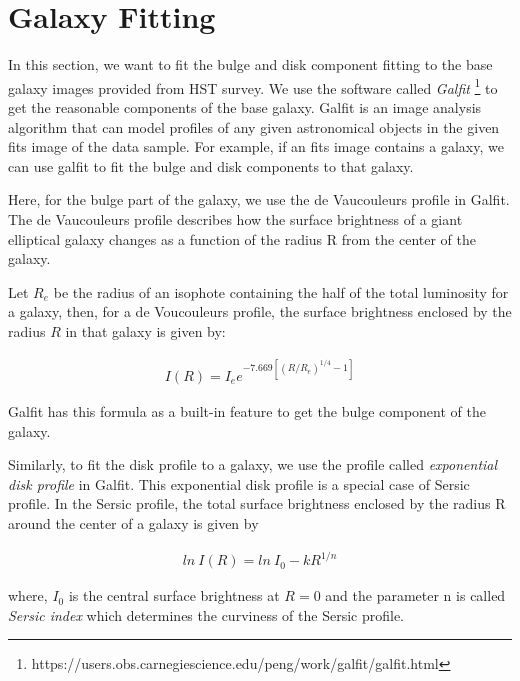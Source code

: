 %
%
%
%
\section{Galaxy Fitting}\label{sec:chap2}
In this section, we want to fit the bulge and disk component fitting to the base 
galaxy images provided from HST survey. We use the software called 
\textit{Galfit} \footnote{https://users.obs.carnegiescience.edu/peng/work/galfit/galfit.html}
to get the reasonable components of the base galaxy. Galfit is an image analysis
algorithm that can model profiles of any given astronomical objects in the given
fits image of the data sample. For example, if an fits image contains a galaxy,
we can use galfit to fit the bulge and disk components to that galaxy.

Here, for the bulge part of the galaxy, we use the de Vaucouleurs profile in 
Galfit.
The de Vaucouleurs profile describes how the surface brightness of a giant
elliptical galaxy changes as a  function of the radius R from the center of the
galaxy.

Let $R_e$ be the radius of an isophote containing the half of the total 
luminosity for a galaxy, then, for a de Voucouleurs profile, the surface 
brightness enclosed by the radius $R$ in that galaxy is given by:

\begin{eqnarray}\label{[eq:devauc]}
    I(R) = I_e e^{-7.669 [ (R/R_e)^{1/4} -1]  }
\end{eqnarray}

Galfit has this formula as a built-in feature to get the bulge component of the
galaxy.

Similarly, to fit the disk profile to a galaxy, we use the profile called 
\textit{exponential disk profile} in Galfit. This exponential disk profile 
is a special case of Sersic profile. In the Sersic
profile, the total surface brightness enclosed by the radius R around the center
of a galaxy is given by

\begin{eqnarray}\label{[eq:sersic]}
    ln \ I(R) = ln \ I_0 - k R^{1/n}
\end{eqnarray}

where, $I_0$ is the central surface brightness at $R = 0$ and the parameter n is 
called \textit{Sersic index} which determines the curviness of the Sersic profile.

